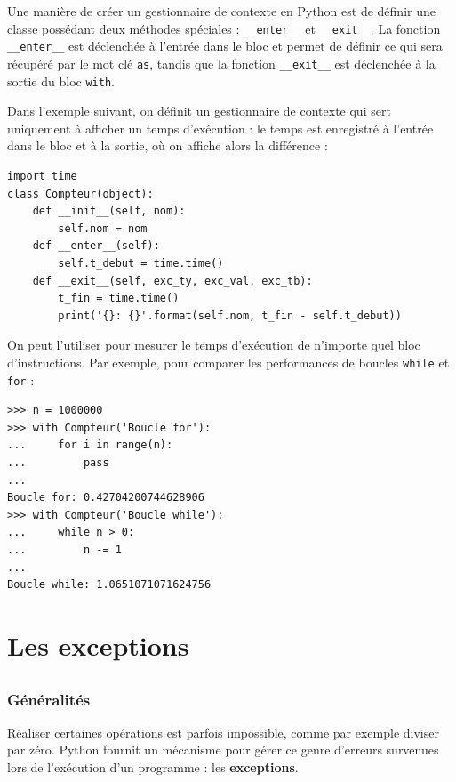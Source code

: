 \documentclass[12pt, a4paper]{article}
\begin{document}
Une manière de créer un gestionnaire de contexte en Python est de définir une classe possédant deux méthodes spéciales : \lstinline{__enter__} et \lstinline{__exit__}. La fonction \lstinline{__enter__} est déclenchée à l'entrée dans le bloc et permet de définir ce qui sera récupéré par le mot clé \lstinline{as}, tandis que la fonction \lstinline{__exit__} est déclenchée à la sortie du bloc \lstinline{with}.

Dans l'exemple suivant, on définit un gestionnaire de contexte qui sert uniquement à afficher un temps d'exécution : le temps est enregistré à l'entrée dans le bloc et à la sortie, où on affiche alors la différence :
\begin{lstlisting}
import time
class Compteur(object):
    def __init__(self, nom):
        self.nom = nom
    def __enter__(self):
        self.t_debut = time.time()
    def __exit__(self, exc_ty, exc_val, exc_tb):
        t_fin = time.time()
        print('{}: {}'.format(self.nom, t_fin - self.t_debut))
\end{lstlisting}

On peut l'utiliser pour mesurer le temps d'exécution de n'importe quel bloc d'instructions. Par exemple, pour comparer les performances de boucles \lstinline{while} et \lstinline{for} :
\begin{lstlisting}
>>> n = 1000000
>>> with Compteur('Boucle for'):
...     for i in range(n):
...         pass
...
Boucle for: 0.42704200744628906
>>> with Compteur('Boucle while'):
...     while n > 0:
...         n -= 1
...
Boucle while: 1.0651071071624756
\end{lstlisting}


\part{Les exceptions}
\chapter{}

\section{Généralités}
Réaliser certaines opérations est parfois impossible, comme par exemple diviser par zéro. Python fournit un mécanisme pour gérer ce genre d'erreurs survenues lors de l'exécution d'un programme : les \textbf{exceptions}.
\end{document}
